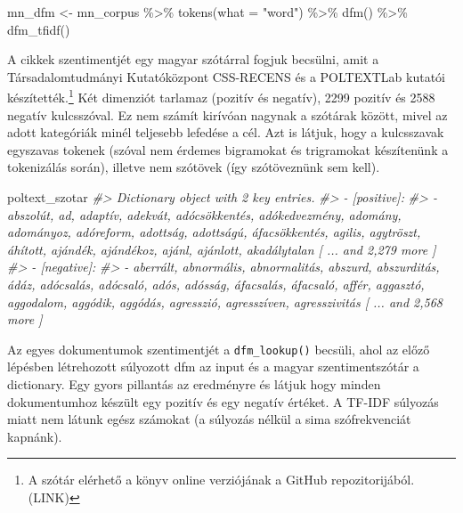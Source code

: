 \documentclass[
]{book}
\newenvironment{Shaded}{\begin{snugshade}}{\end{snugshade}}
\newcommand{\AttributeTok}[1]{\textcolor[rgb]{0.77,0.63,0.00}{#1}}
\newcommand{\CommentTok}[1]{\textcolor[rgb]{0.56,0.35,0.01}{\textit{#1}}}
\newcommand{\FunctionTok}[1]{\textcolor[rgb]{0.00,0.00,0.00}{#1}}
\newcommand{\NormalTok}[1]{#1}
\newcommand{\OtherTok}[1]{\textcolor[rgb]{0.56,0.35,0.01}{#1}}
\newcommand{\SpecialCharTok}[1]{\textcolor[rgb]{0.00,0.00,0.00}{#1}}
\newcommand{\StringTok}[1]{\textcolor[rgb]{0.31,0.60,0.02}{#1}}
\begin{document}
\begin{Shaded}
\begin{Highlighting}[]
\NormalTok{mn\_dfm }\OtherTok{\textless{}{-}}\NormalTok{ mn\_corpus }\SpecialCharTok{\%\textgreater{}\%}
  \FunctionTok{tokens}\NormalTok{(}\AttributeTok{what =} \StringTok{"word"}\NormalTok{) }\SpecialCharTok{\%\textgreater{}\%}
  \FunctionTok{dfm}\NormalTok{() }\SpecialCharTok{\%\textgreater{}\%}
  \FunctionTok{dfm\_tfidf}\NormalTok{()}
\end{Highlighting}
\end{Shaded}

A cikkek szentimentjét egy magyar szótárral fogjuk becsülni, amit a
Társadalomtudmányi Kutatóközpont CSS-RECENS és a POLTEXTLab kutatói
készítették.\footnote{A szótár elérhető a könyv online verziójának a
  GitHub repozitorijából. (LINK)} Két dimenziót tarlamaz (pozitív és
negatív), 2299 pozitív és 2588 negatív kulcsszóval. Ez nem számít
kirívóan nagynak a szótárak között, mivel az adott kategóriák minél
teljesebb lefedése a cél. Azt is látjuk, hogy a kulcsszavak egyszavas
tokenek (szóval nem érdemes bigramokat és trigramokat készítenünk a
tokenizálás során), illetve nem szótövek (így szótöveznünk sem kell).

\begin{Shaded}
\begin{Highlighting}[]
\NormalTok{poltext\_szotar}
\CommentTok{\#\textgreater{} Dictionary object with 2 key entries.}
\CommentTok{\#\textgreater{} {-} [positive]:}
\CommentTok{\#\textgreater{}   {-} abszolút, ad, adaptív, adekvát, adócsökkentés, adókedvezmény, adomány, adományoz, adóreform, adottság, adottságú, áfacsökkentés, agilis, agytröszt, áhított, ajándék, ajándékoz, ajánl, ajánlott, akadálytalan [ ... and 2,279 more ]}
\CommentTok{\#\textgreater{} {-} [negative]:}
\CommentTok{\#\textgreater{}   {-} aberrált, abnormális, abnormalitás, abszurd, abszurditás, ádáz, adócsalás, adócsaló, adós, adósság, áfacsalás, áfacsaló, affér, aggasztó, aggodalom, aggódik, aggódás, agresszió, agresszíven, agresszivitás [ ... and 2,568 more ]}
\end{Highlighting}
\end{Shaded}

Az egyes dokumentumok szentimentjét a \texttt{dfm\_lookup()} becsüli,
ahol az előző lépésben létrehozott súlyozott dfm az input és a magyar
szentimentszótár a dictionary. Egy gyors pillantás az eredményre és
látjuk hogy minden dokumentumhoz készült egy pozitív és egy negatív
értéket. A TF-IDF súlyozás miatt nem látunk egész számokat (a súlyozás
nélkül a sima szófrekvenciát kapnánk).
\end{document}
